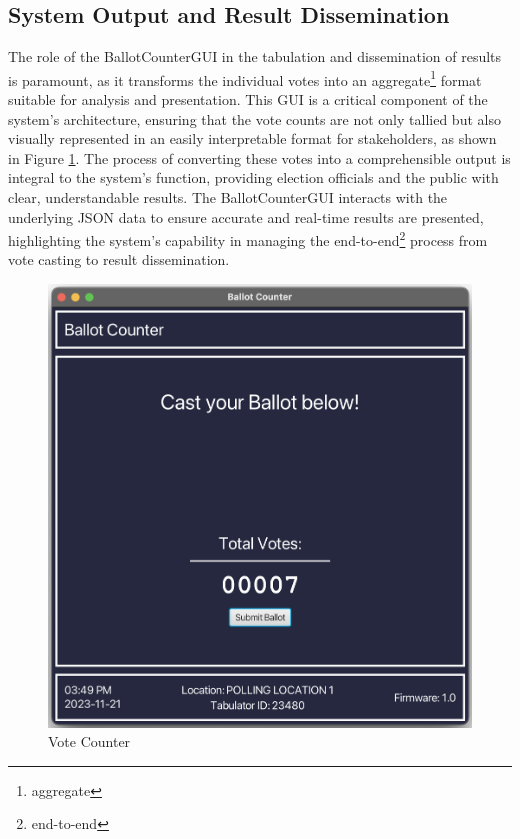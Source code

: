 \documentclass{article}
\begin{document}
\subsection{System Output and Result Dissemination}
The role of the BallotCounterGUI in the tabulation and dissemination of results is paramount, as it transforms the individual votes into an \gls{aggregate}\footnote{\glsdesc{aggregate}} format suitable for analysis and presentation. This GUI is a critical component of the system's architecture, ensuring that the vote counts are not only tallied but also visually represented in an easily interpretable format for stakeholders, as shown in Figure 
\ref{fig:counter}. The process of converting these votes into a comprehensible output is integral to the system's function, providing election officials and the public with clear, understandable results. The 
BallotCounterGUI interacts with the underlying JSON data to ensure accurate and real-time results are presented, highlighting the system’s capability in managing the \gls{end-to-end}\footnote{\glsdesc{end-to-end}} process from vote casting to result dissemination.

\begin{figure}[h]
    \centering
    \includegraphics[scale=0.3]{docs/sad/figures/counter.png}
    \caption{Vote Counter}
    \label{fig:counter}
\end{figure}
\end{document}
